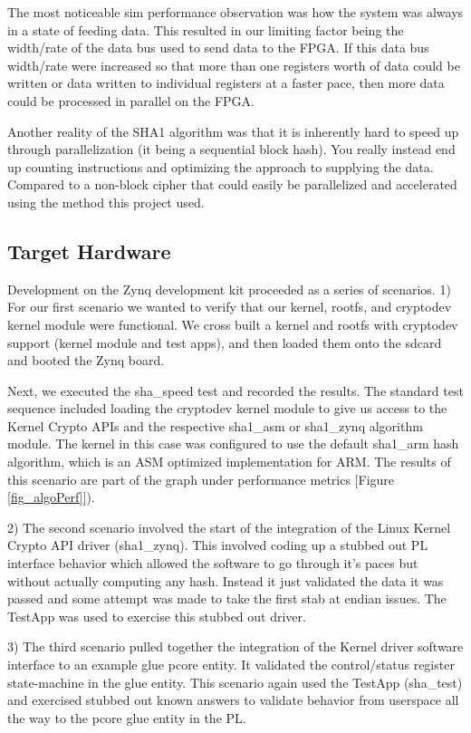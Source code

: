 \documentclass[journal]{IEEEtran}
\begin{document}
The most noticeable sim performance observation was how the system was always in a state of feeding data.  This resulted in our limiting factor being the width/rate of the data bus used to send data to the FPGA.  If this data bus width/rate were increased so that more than one registers worth of data could be written or data written to individual registers at a faster pace, then more data could be processed in parallel on the FPGA.  

Another reality of the SHA1 algorithm was that it is inherently hard to speed up through parallelization (it being a sequential block hash).  You really instead end up counting instructions and optimizing the approach to supplying the data.  Compared to a non-block cipher that could easily be parallelized and accelerated using the method this project used. 
\subsection{Target Hardware}
Development on the Zynq development kit proceeded as a series of scenarios.
1) For our first scenario we wanted to verify that our kernel, rootfs, and cryptodev kernel module were functional.  We cross built a kernel and rootfs with cryptodev support (kernel module and test apps), and then loaded them onto the sdcard and booted the Zynq board.  

Next, we executed the sha\_speed test and recorded the results.  The standard test sequence included loading the cryptodev kernel module to give us access to the Kernel Crypto APIs and the respective sha1\_asm or sha1\_zynq algorithm module.  
The kernel in this case was configured to use the default sha1\_arm hash algorithm, which is an ASM optimized implementation for ARM.  The results of this scenario are part of the graph under performance metrics [Figure \ref{fig_algoPerf}]).

2) The second scenario involved the start of the integration of the Linux Kernel Crypto API driver (sha1\_zynq).  This involved coding up a stubbed out PL interface behavior which allowed the software to go through it’s paces but without actually computing any hash.  Instead it just validated the data it was passed and some attempt was made to take the first stab at endian issues.  The TestApp was used to exercise this stubbed out driver.

3) The third scenario pulled together the integration of the Kernel driver software interface to an example glue pcore entity.  It validated the control/status register state-machine in the glue entity.  This scenario again used the TestApp (sha\_test) and exercised stubbed out known answers to validate behavior from userspace all the way to the pcore glue entity in the PL.
\end{document}
